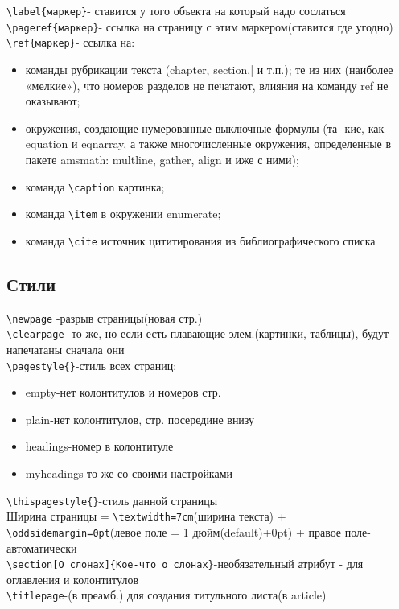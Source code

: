 \documentclass[a4paper,12pt]{article}%
\theoremstyle{plain}%
\theoremstyle{definition}%
\theoremstyle{remark}%
\begin{document}
\verb|\label{маркер}|- ставится у того объекта на который надо сослаться \\
\verb|\pageref{маркер}|- ссылка на страницу с этим маркером(ставится где угодно)\\
\verb|\ref{маркер}|- ссылка на:
\begin{itemize}
\item команды рубрикации текста (chapter, section,| и т.п.); те из них 
(наиболее «мелкие»), что номеров разделов не печатают, влияния 
на команду ref не оказывают; 
\item окружения, создающие нумерованные выключные формулы (та- 
кие, как equation и eqnarray, а также многочисленные окружения, 
определенные в пакете amsmath: multline, gather, align и иже с 
ними);
\item команда \verb|\caption| картинка;
\item команда \verb|\item| в окружении enumerate; 
\item команда \verb|\cite| источник цититирования из библиографического списка
\end{itemize}



\subsection{Стили}

\verb|\newpage| -разрыв страницы(новая стр.) \\
\verb|\clearpage| -то же, но если есть плавающие элем.(картинки, таблицы), будут напечатаны сначала они \\
\verb|\pagestyle{}|-стиль всех страниц:
\begin{itemize}
\item empty-нет колонтитулов и номеров стр.
\item plain-нет колонтитулов, стр. посередине внизу
\item headings-номер в колонтитуле
\item myheadings-то же со своими настройками
\end{itemize}
\verb|\thispagestyle{}|-стиль данной страницы \\
Ширина страницы = \verb|\textwidth=7cm|(ширина текста) + \verb|\oddsidemargin=0pt|(левое поле = 1 дюйм(default)+0pt) + правое поле-автоматически \\
\verb|\section[О слонах]{Кое-что о слонах}|-необязательный атрибут - для оглавления и колонтитулов \\
\verb|\titlepage|-(в преамб.) для создания титульного листа(в article)
\end{document}
